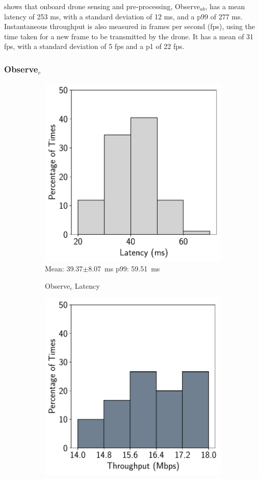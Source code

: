  shows that onboard drone sensing and
pre-processing, Observe$_{ab}$, has a mean latency of 253 ms, with a standard
deviation of 12 ms, and a p99 of 277 ms. Instantaneous throughput is also
measured in frames per second (fps), using the time taken for a new frame to be
transmitted by the drone. It has a mean of 31 fps, with a standard deviation of
5 fps and a p1 of 22 fps.

\subsubsection{Observe$_c$}

\begin{figure}[htbp]
    \centering
    \begin{subfigure}[t]{0.45\textwidth}
    \centering
    \includegraphics[width = .8\textwidth]{figs/observe-c-latency.pdf}\\
    \small{Mean: 39.37$\pm$8.07~ms\; p99: 59.51~ms}\\
    \caption{Observe$_{c}$ Latency}
    \label{fig:observe_c_latency}
\end{subfigure}
\begin{subfigure}[t]{0.45\textwidth}
    \centerline{\includegraphics[width = .8\textwidth]{figs/observe-c-throughput.pdf}}

\end{subfigure}
\end{figure}

